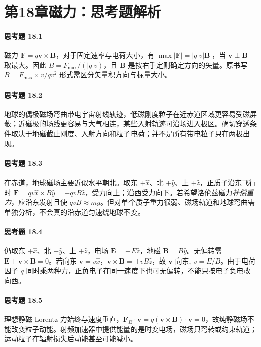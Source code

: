 \section*{第18章\quad 磁力：思考题解析}
\paragraph{思考题 18.1}
磁力 \(\boldsymbol F=q\boldsymbol v\times\boldsymbol B\)，对于固定速率与电荷大小，有 \(\max|\boldsymbol F|=|q|v|\boldsymbol B|\)，当 \(\boldsymbol v\perp\boldsymbol B\) 取最大。因此 \(\boxed{B=F_{\max}/(|q|v)}\)，且 \(\boldsymbol B\) 是按右手定则确定方向的矢量。原书写 \(B=F_{\max}\times v/qv^2\) 形式需区分矢量积方向与标量大小。

\paragraph{思考题 18.2}
地球的偶极磁场弯曲带电宇宙射线轨迹，低磁刚度粒子在近赤道区域更容易受磁屏蔽；近磁极的场线更容易与大气相连，某些入射轨迹可沿场进入极区。确切穿透条件取决于地磁截止刚度、入射方向和粒子电荷；并不是所有带电粒子只在两极出现。

\paragraph{思考题 18.3}
在赤道，地球磁场主要近似水平朝北。取东 \(+\hat x\)、北 \(+\hat y\)、上 \(+\hat z\)，正质子沿东飞行时 \(\boldsymbol F=qv\hat x\times B\hat y=+qvB\hat z\)，受力向上；沿西受力向下。若希望洛伦兹磁力\emph{补偿重力}，应沿东发射且使 \(qvB\approx mg\)。但对单个质子重力很弱、磁场轨道和地球弯曲需单独分析，不会真的沿赤道匀速绕地球不变。

\paragraph{思考题 18.4}
仍取东 \(+\hat x\)、北 \(+\hat y\)、上 \(+\hat z\)，电场 \(\boldsymbol E=-E\hat z\)，地磁 \(\boldsymbol B=B\hat y\)。无偏转需 \(\boldsymbol E+\boldsymbol v\times\boldsymbol B=0\)。若向东 \(\boldsymbol v=v\hat x\)，\(\boldsymbol v\times\boldsymbol B=+vB\hat z\)，故 \(\boxed{\boldsymbol v\text{ 向东},\ v=E/B}\)。由于电荷因子 \(q\) 同时乘两种力，正负电子在同一速度下也可无偏转，不能只按电子负电改向西。

\paragraph{思考题 18.5}
理想静磁 Lorentz 力始终与速度垂直，\(\boxed{\boldsymbol F_B\cdot\boldsymbol v=q(\boldsymbol v\times\boldsymbol B)\cdot\boldsymbol v=0}\)，故纯静磁场不能改变粒子动能。射频加速器中提供能量的是时变电场，磁场只弯转或约束轨道；运动粒子在辐射损失后动能甚至可能减小。


